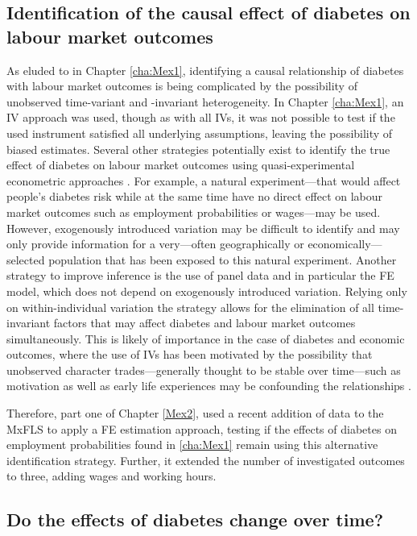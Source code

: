 \subsection{Identification of the causal effect of diabetes on labour market outcomes}

As eluded to in Chapter \ref{cha:Mex1}, identifying a causal relationship of diabetes with labour market outcomes is being complicated by the possibility of unobserved time-variant and -invariant heterogeneity. In Chapter \ref{cha:Mex1}, an \ac{IV} approach was used, though as with all \acp{IV}, it was not possible to test if the used instrument satisfied all underlying assumptions, leaving the possibility of biased estimates. Several other strategies potentially exist to identify the true effect of diabetes on labour market outcomes using quasi-experimental econometric approaches \parencite{Antonakis2012}. For example, a natural experiment---that would affect people's diabetes risk while at the same time have no direct effect on labour market outcomes such as employment probabilities or wages---may be used. However, exogenously introduced variation may be difficult to identify and may only provide information for a very---often geographically or economically---selected population that has been exposed to this natural experiment. Another strategy to improve inference is the use of panel data and in particular the \ac{FE} model, which does not depend on exogenously introduced variation. Relying only on within-individual variation the strategy allows for the elimination of all time-invariant factors that may affect diabetes and labour market outcomes simultaneously. This is likely of importance in the case of diabetes and economic outcomes, where the use of \ac{IV}s has been motivated by the possibility that unobserved character trades---generally thought to be stable over time---such as motivation as well as early life experiences may be confounding the relationships \parencite{Seuring2015}.

Therefore, part one of Chapter \ref{Mex2}, used a recent addition of data to the \ac{MxFLS} to apply a \ac{FE} estimation approach, testing if the effects of diabetes on employment probabilities found in \ref{cha:Mex1} remain using this alternative identification strategy. Further, it extended the number of investigated outcomes to three, adding wages and working hours.

\subsection{Do the effects of diabetes change over time?}

